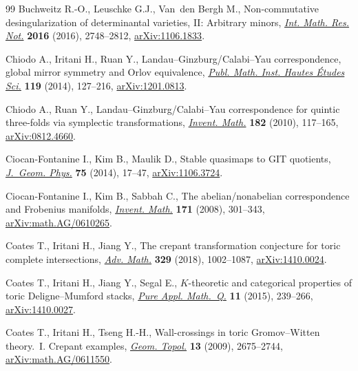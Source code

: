 \documentclass[pdftex]{sigma}
\numberwithin{equation}{section}
\begin{document}
\begin{thebibliography}{99}
Buchweitz R.-O., Leuschke G.J., Van~den Bergh M., Non-commutative
 desingularization of determinantal varieties, {II}: {A}rbitrary minors,
 \href{https://doi.org/10.1093/imrn/rnv207}{\textit{Int. Math. Res. Not.}} \textbf{2016} (2016), 2748--2812,
 \href{https://arxiv.org/abs/1106.1833}{arXiv:1106.1833}.

Chiodo A., Iritani H., Ruan Y., Landau--{G}inzburg/{C}alabi--{Y}au
 correspondence, global mirror symmetry and {O}rlov equivalence, \href{https://doi.org/10.1007/s10240-013-0056-z}{\textit{Publ.
 Math. Inst. Hautes \'Etudes Sci.}} \textbf{119} (2014), 127--216,
 \href{https://arxiv.org/abs/1201.0813}{arXiv:1201.0813}.

Chiodo A., Ruan Y., Landau--{G}inzburg/{C}alabi--{Y}au correspondence for
 quintic three-folds via symplectic transformations, \href{https://doi.org/10.1007/s00222-010-0260-0}{\textit{Invent. Math.}}
 \textbf{182} (2010), 117--165, \href{https://arxiv.org/abs/0812.4660}{arXiv:0812.4660}.

Ciocan-Fontanine I., Kim B., Maulik D., Stable quasimaps to {GIT} quotients,
 \href{https://doi.org/10.1016/j.geomphys.2013.08.019}{\textit{J.~Geom. Phys.}} \textbf{75} (2014), 17--47, \href{https://arxiv.org/abs/1106.3724}{arXiv:1106.3724}.

Ciocan-Fontanine I., Kim B., Sabbah C., The abelian/nonabelian correspondence
 and {F}robenius manifolds, \href{https://doi.org/10.1007/s00222-007-0082-x}{\textit{Invent. Math.}} \textbf{171} (2008),
 301--343, \href{https://arxiv.org/abs/math.AG/0610265}{arXiv:math.AG/0610265}.

Coates T., Iritani H., Jiang Y., The crepant transformation conjecture for
 toric complete intersections, \href{https://doi.org/10.1016/j.aim.2017.11.017}{\textit{Adv. Math.}} \textbf{329} (2018),
 1002--1087, \href{https://arxiv.org/abs/1410.0024}{arXiv:1410.0024}.

Coates T., Iritani H., Jiang Y., Segal E., {$K$}-theoretic and categorical
 properties of toric {D}eligne--{M}umford stacks, \href{https://doi.org/10.4310/PAMQ.2015.v11.n2.a3}{\textit{Pure Appl. Math.~Q.}}
 \textbf{11} (2015), 239--266, \href{https://arxiv.org/abs/1410.0027}{arXiv:1410.0027}.

Coates T., Iritani H., Tseng H.-H., Wall-crossings in toric {G}romov--{W}itten
 theory.~{I}. {C}repant examples, \href{https://doi.org/10.2140/gt.2009.13.2675}{\textit{Geom. Topol.}} \textbf{13} (2009),
 2675--2744, \href{https://arxiv.org/abs/math.AG/0611550}{arXiv:math.AG/0611550}.


\end{thebibliography}
\end{document}
